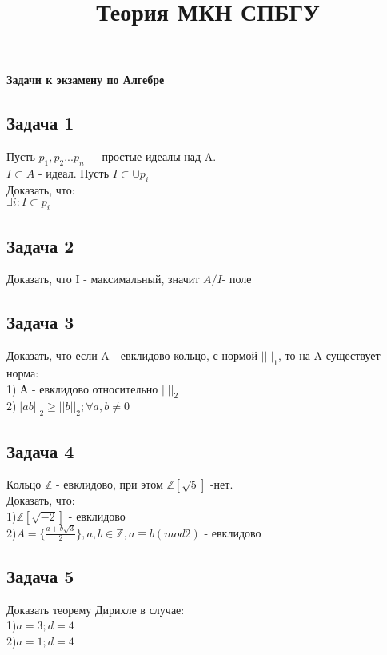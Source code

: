 \documentclass{article}
\title{Теория МКН СПБГУ}
\begin{document}
\begin{titlepage}
\begin{center}
{\LARGE \textbf{Задачи к экзамену по Алгебре}}
\end{center}
\begin{figure}[h]
\centering
\end{figure}
\end{titlepage}

\subsection*{Задача 1}
Пусть $p_1,p_2...p_n - $ простые идеалы над A.\\
$I\subset A$ - идеал. Пусть $I \subset \cup p_i$\\
Доказать, что:\\
$\exists i: I \subset p_i$

\subsection*{Задача 2}

Доказать, что I - максимальный, значит $A/I$- поле

\subsection*{Задача 3}

Доказать, что если A - евклидово кольцо, с нормой $|| ||_1$, то на A существует норма:\\
1) А - евклидово относительно $|| ||_2$\\
2)$||ab||_2\geq||b||_2; \forall a,b \neq 0$

\subsection*{Задача 4}

Кольцо $\mathbb{Z}$ - евклидово, при этом $\mathbb{Z}[\sqrt{5}]$ -нет.\\
Доказать, что:\\
1)$\mathbb{Z}[\sqrt{-2}]$ - евклидово\\
2)$A = \lbrace \frac{a+b\sqrt{3}}{2}\rbrace, a,b \in \mathbb{Z}, a\equiv b (mod 2)$ - евклидово
\subsection*{Задача 5}
Доказать теорему Дирихле в случае:\\
1)$a=3;d=4$\\
2)$a=1;d=4$
\end{document}
